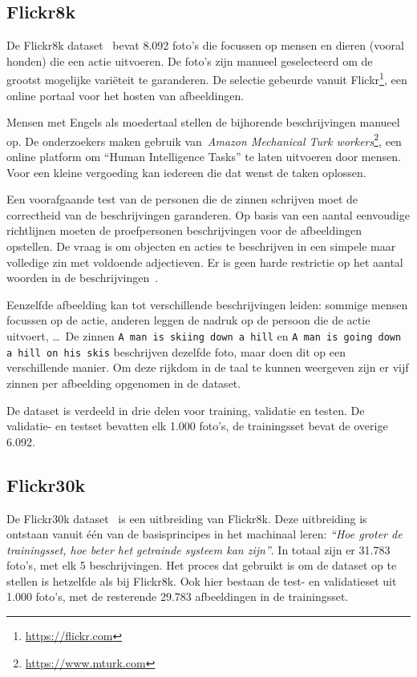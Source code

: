 \subsection{Flickr8k}
\label{par:Flickr8k}
De Flickr8k dataset~\cite{Hodosh2013} bevat 8.092 foto's die focussen op mensen en dieren (vooral honden) die een actie uitvoeren. De foto's zijn manueel geselecteerd om de grootst mogelijke vari\"eteit te garanderen. De selectie gebeurde vanuit Flickr\footnote{\url{https://flickr.com}}, een online portaal voor het hosten van afbeeldingen.

Mensen met Engels als moedertaal stellen de bijhorende beschrijvingen manueel op. De onderzoekers maken gebruik van~\emph{Amazon Mechanical Turk workers}\footnote{\url{https://www.mturk.com}}, een online platform om ``Human Intelligence Tasks'' te laten uitvoeren door mensen. Voor een kleine vergoeding kan iedereen die dat wenst de taken oplossen. 

Een voorafgaande test van de personen die de zinnen schrijven moet de correctheid van de beschrijvingen garanderen. Op basis van een aantal eenvoudige richtlijnen moeten de proefpersonen beschrijvingen voor de afbeeldingen opstellen. De vraag is om objecten en acties te beschrijven in een simpele maar volledige zin met voldoende adjectieven. Er is geen harde restrictie op het aantal woorden in de beschrijvingen~\cite{Hockenmaier2014}.

Eenzelfde afbeelding kan tot verschillende beschrijvingen leiden: sommige mensen focussen op de actie, anderen leggen de nadruk op de persoon die de actie uitvoert, \ldots\  De zinnen \texttt{A man is skiing down a hill} en \texttt{A man is going down a hill on his skis} beschrijven dezelfde foto, maar doen dit op een verschillende manier. Om deze rijkdom in de taal te kunnen weergeven zijn er vijf zinnen per afbeelding opgenomen in de dataset.

De dataset is verdeeld in drie delen voor training, validatie en testen. De validatie- en testset bevatten elk 1.000 foto's, de trainingsset bevat de overige 6.092.


\subsection{Flickr30k}
\label{par:Flickr30k}
De Flickr30k dataset~\cite{Young2014} is een uitbreiding van Flickr8k. Deze uitbreiding is ontstaan vanuit \'e\'en van de basisprincipes in het machinaal leren: \emph{``Hoe groter de trainingsset, hoe beter het getrainde systeem kan zijn''}. In totaal zijn er 31.783 foto's, met elk 5 beschrijvingen. Het proces dat gebruikt is om de dataset op te stellen is hetzelfde als bij Flickr8k. Ook hier bestaan de test- en validatieset uit 1.000 foto's, met de resterende 29.783 afbeeldingen in de trainingsset.

